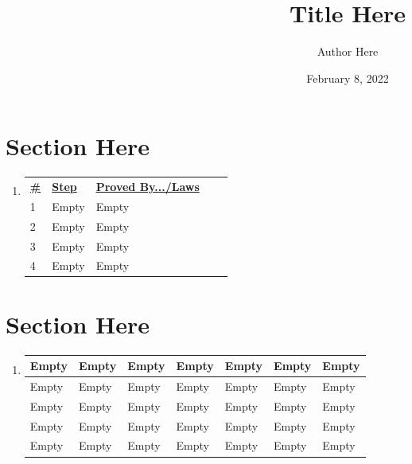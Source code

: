 \documentclass[12pt]{extarticle}
\title{Title Here}
\author{Author Here}
\date{February 8, 2022}
\begin{document}
\maketitle

\newpage
\section{Section Here}

\begin{enumerate}
    \item[]
    \begin{table}[h!]
        \begin{center}
            \begin{tabular}{|l|l|l|ll}
            \cline{1-3}
            \textbf{\underline{\#}} & \textbf{\underline{Step}} & \textbf{\underline{Proved By.../Laws}} &  &  \\ \cline{1-3}
             1 & Empty & Empty &  &  \\ \cline{1-3}
             2 & Empty & Empty &  &  \\ \cline{1-3}
             3 & Empty & Empty &  &  \\ \cline{1-3}
             4 & Empty & Empty &  &  \\ \cline{1-3}
            \end{tabular}
        \end{center}
    \end{table}
\end{enumerate}

\newpage
\section{Section Here}

\begin{enumerate}
    \item[]
    
    \begin{tabularx}{0.8\textwidth} { 
        | >{\centering\arraybackslash}X 
        | >{\centering\arraybackslash}X 
        | >{\centering\arraybackslash}X
        | >{\centering\arraybackslash}X
        | >{\centering\arraybackslash}X
        | >{\centering\arraybackslash}X
        | >{\centering\arraybackslash}X | }
        \hline
        Empty & Empty & Empty & Empty & Empty & Empty & Empty \\
        \hline
        Empty & Empty & Empty & Empty & Empty & Empty & Empty \\
        \hline
        Empty & Empty & Empty & Empty & Empty & Empty & Empty \\
        \hline
        Empty & Empty & Empty & Empty & Empty & Empty & Empty \\
        \hline
        Empty & Empty & Empty & Empty & Empty & Empty & Empty \\
        \hline
      \end{tabularx}
\end{enumerate}
\end{document}
